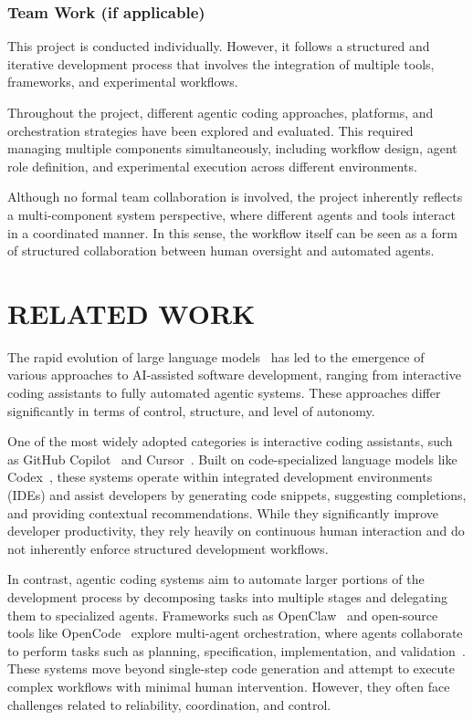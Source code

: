 \documentclass[a4paper,12pt]{report}
\begin{document}
\subsection{Team Work (if applicable)}
This project is conducted individually. However, it follows a structured and iterative development process that involves the integration of multiple tools, frameworks, and experimental workflows.

Throughout the project, different agentic coding approaches, platforms, and orchestration strategies have been explored and evaluated. This required managing multiple components simultaneously, including workflow design, agent role definition, and experimental execution across different environments.

Although no formal team collaboration is involved, the project inherently reflects a multi-component system perspective, where different agents and tools interact in a coordinated manner. In this sense, the workflow itself can be seen as a form of structured collaboration between human oversight and automated agents.

\chapter{RELATED WORK}
The rapid evolution of large language models~\cite{llm} has led to the emergence of various approaches to AI-assisted software development, ranging from interactive coding assistants to fully automated agentic systems. These approaches differ significantly in terms of control, structure, and level of autonomy.

One of the most widely adopted categories is interactive coding assistants, such as GitHub Copilot~\cite{copilot} and Cursor~\cite{cursor}. Built on code-specialized language models like Codex~\cite{codex}, these systems operate within integrated development environments (IDEs) and assist developers by generating code snippets, suggesting completions, and providing contextual recommendations. While they significantly improve developer productivity, they rely heavily on continuous human interaction and do not inherently enforce structured development workflows.

In contrast, agentic coding systems aim to automate larger portions of the development process by decomposing tasks into multiple stages and delegating them to specialized agents. Frameworks such as OpenClaw~\cite{openclaw} and open-source tools like OpenCode~\cite{opencode} explore multi-agent orchestration, where agents collaborate to perform tasks such as planning, specification, implementation, and validation~\cite{vidagenticcoding2026,vidagenticengineering}. These systems move beyond single-step code generation and attempt to execute complex workflows with minimal human intervention. However, they often face challenges related to reliability, coordination, and control.
\end{document}
